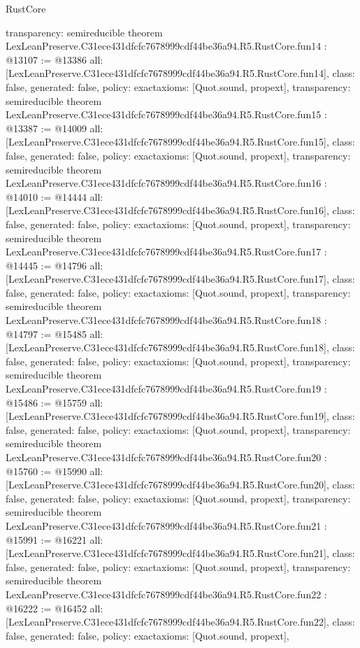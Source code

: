 \begin{lexlean}{RustCore}
\begin{coremodule}
{  transparency: semireducible
}
theorem LexLeanPreserve.C31ece431dfcfc7678999cdf44be36a94.R5.RustCore.fun14 : @13107 := @13386 {
  all: [LexLeanPreserve.C31ece431dfcfc7678999cdf44be36a94.R5.RustCore.fun14],
  class: false,
  generated: false,
  policy: exact{axioms: [Quot.sound, propext]},
  transparency: semireducible
}
theorem LexLeanPreserve.C31ece431dfcfc7678999cdf44be36a94.R5.RustCore.fun15 : @13387 := @14009 {
  all: [LexLeanPreserve.C31ece431dfcfc7678999cdf44be36a94.R5.RustCore.fun15],
  class: false,
  generated: false,
  policy: exact{axioms: [Quot.sound, propext]},
  transparency: semireducible
}
theorem LexLeanPreserve.C31ece431dfcfc7678999cdf44be36a94.R5.RustCore.fun16 : @14010 := @14444 {
  all: [LexLeanPreserve.C31ece431dfcfc7678999cdf44be36a94.R5.RustCore.fun16],
  class: false,
  generated: false,
  policy: exact{axioms: [Quot.sound, propext]},
  transparency: semireducible
}
theorem LexLeanPreserve.C31ece431dfcfc7678999cdf44be36a94.R5.RustCore.fun17 : @14445 := @14796 {
  all: [LexLeanPreserve.C31ece431dfcfc7678999cdf44be36a94.R5.RustCore.fun17],
  class: false,
  generated: false,
  policy: exact{axioms: [Quot.sound, propext]},
  transparency: semireducible
}
theorem LexLeanPreserve.C31ece431dfcfc7678999cdf44be36a94.R5.RustCore.fun18 : @14797 := @15485 {
  all: [LexLeanPreserve.C31ece431dfcfc7678999cdf44be36a94.R5.RustCore.fun18],
  class: false,
  generated: false,
  policy: exact{axioms: [Quot.sound, propext]},
  transparency: semireducible
}
theorem LexLeanPreserve.C31ece431dfcfc7678999cdf44be36a94.R5.RustCore.fun19 : @15486 := @15759 {
  all: [LexLeanPreserve.C31ece431dfcfc7678999cdf44be36a94.R5.RustCore.fun19],
  class: false,
  generated: false,
  policy: exact{axioms: [Quot.sound, propext]},
  transparency: semireducible
}
theorem LexLeanPreserve.C31ece431dfcfc7678999cdf44be36a94.R5.RustCore.fun20 : @15760 := @15990 {
  all: [LexLeanPreserve.C31ece431dfcfc7678999cdf44be36a94.R5.RustCore.fun20],
  class: false,
  generated: false,
  policy: exact{axioms: [Quot.sound, propext]},
  transparency: semireducible
}
theorem LexLeanPreserve.C31ece431dfcfc7678999cdf44be36a94.R5.RustCore.fun21 : @15991 := @16221 {
  all: [LexLeanPreserve.C31ece431dfcfc7678999cdf44be36a94.R5.RustCore.fun21],
  class: false,
  generated: false,
  policy: exact{axioms: [Quot.sound, propext]},
  transparency: semireducible
}
theorem LexLeanPreserve.C31ece431dfcfc7678999cdf44be36a94.R5.RustCore.fun22 : @16222 := @16452 {
  all: [LexLeanPreserve.C31ece431dfcfc7678999cdf44be36a94.R5.RustCore.fun22],
  class: false,
  generated: false,
  policy: exact{axioms: [Quot.sound, propext]},
}
\end{coremodule}
\end{lexlean}
